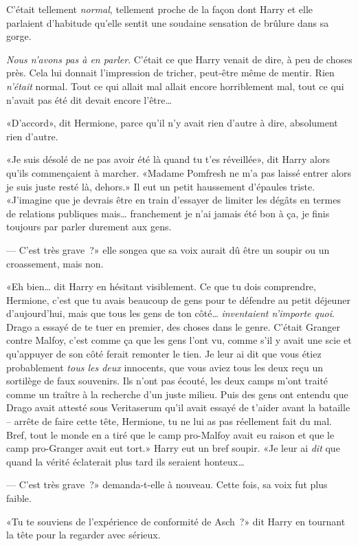C'était tellement \emph{normal}, tellement proche de la façon dont Harry et elle parlaient d'habitude qu'elle sentit une soudaine sensation de brûlure dans sa gorge.

\emph{Nous n'avons pas à en parler}. C'était ce que Harry venait de dire, à peu de choses près. Cela lui donnait l'impression de tricher, peut-être même de mentir. Rien \emph{n'était} normal. Tout ce qui allait mal allait encore horriblement mal, tout ce qui n'avait pas été dit devait encore l'être…

«D'accord», dit Hermione, parce qu'il n'y avait rien d'autre à dire, absolument rien d'autre.

«Je suis désolé de ne pas avoir été là quand tu t'es réveillée», dit Harry alors qu'ils commençaient à marcher. «Madame Pomfresh ne m'a pas laissé entrer alors je suis juste resté là, dehors.» Il eut un petit haussement d'épaules triste. «J'imagine que je devrais être en train d'essayer de limiter les dégâts en termes de relations publiques mais… franchement je n'ai jamais été bon à ça, je finis toujours par parler durement aux gens.

--- C'est très grave~?» elle songea que sa voix aurait dû être un soupir ou un croassement, mais non.

«Eh bien… dit Harry en hésitant visiblement. Ce que tu dois comprendre, Hermione, c'est que tu avais beaucoup de gens pour te défendre au petit déjeuner d'aujourd'hui, mais que tous les gens de ton côté… \emph{inventaient n'importe quoi}. Drago a essayé de te tuer en premier, des choses dans le genre. C'était Granger contre Malfoy, c'est comme ça que les gens l'ont vu, comme s'il y avait une scie et qu'appuyer de son côté ferait remonter le tien. Je leur ai dit que vous étiez probablement \emph{tous les deux} innocents, que vous aviez tous les deux reçu un sortilège de faux souvenirs. Ils n'ont pas écouté, les deux camps m'ont traité comme un traître à la recherche d'un juste milieu. Puis des gens ont entendu que Drago avait attesté sous Veritaserum qu'il avait essayé de t'aider avant la bataille -- arrête de faire cette tête, Hermione, tu ne lui as pas réellement fait du mal. Bref, tout le monde en a tiré que le camp pro-Malfoy avait eu raison et que le camp pro-Granger avait eut tort.» Harry eut un bref soupir. «Je leur ai \emph{dit} que quand la vérité éclaterait plus tard ils seraient honteux…

--- C'est très grave~?» demanda-t-elle à nouveau. Cette fois, sa voix fut plus faible.

«Tu te souviens de l'expérience de conformité de Asch~?» dit Harry en tournant la tête pour la regarder avec sérieux.

